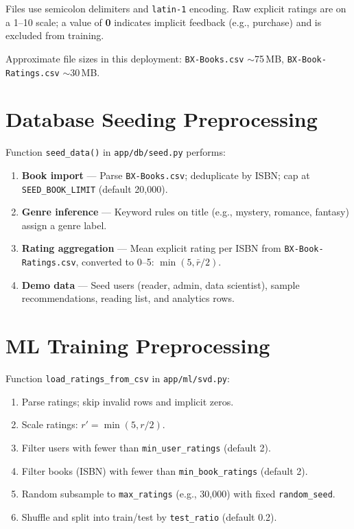 \documentclass[12pt,a4paper]{report}
\begin{document}
Files use semicolon delimiters and \texttt{latin-1} encoding. Raw explicit ratings are on a 1--10 scale; a value of \textbf{0} indicates implicit feedback (e.g., purchase) and is excluded from training.

Approximate file sizes in this deployment: \texttt{BX-Books.csv} $\sim$75\,MB, \texttt{BX-Book-Ratings.csv} $\sim$30\,MB.

\section{Database Seeding Preprocessing}

Function \texttt{seed\_data()} in \texttt{app/db/seed.py} performs:
\begin{enumerate}
    \item \textbf{Book import} --- Parse \texttt{BX-Books.csv}; deduplicate by ISBN; cap at \texttt{SEED\_BOOK\_LIMIT} (default 20,000).
    \item \textbf{Genre inference} --- Keyword rules on title (e.g., mystery, romance, fantasy) assign a genre label.
    \item \textbf{Rating aggregation} --- Mean explicit rating per ISBN from \texttt{BX-Book-Ratings.csv}, converted to 0--5: $\min(5, \bar{r}/2)$.
    \item \textbf{Demo data} --- Seed users (reader, admin, data scientist), sample recommendations, reading list, and analytics rows.
\end{enumerate}

\section{ML Training Preprocessing}

Function \texttt{load\_ratings\_from\_csv} in \texttt{app/ml/svd.py}:
\begin{enumerate}
    \item Parse ratings; skip invalid rows and implicit zeros.
    \item Scale ratings: $r' = \min(5, r/2)$.
    \item Filter users with fewer than \texttt{min\_user\_ratings} (default 2).
    \item Filter books (ISBN) with fewer than \texttt{min\_book\_ratings} (default 2).
    \item Random subsample to \texttt{max\_ratings} (e.g., 30,000) with fixed \texttt{random\_seed}.
    \item Shuffle and split into train/test by \texttt{test\_ratio} (default 0.2).
\end{enumerate}
\end{document}
